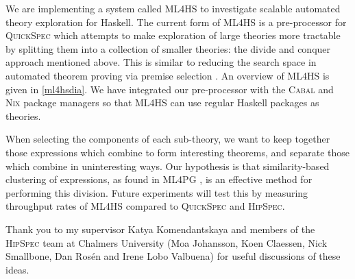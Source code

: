 \documentclass{eceasst}
\begin{document}
We are implementing a system called \textsc{ML4HS} to investigate scalable
automated theory exploration for Haskell. The current form of \textsc{ML4HS} is
a pre-processor for \textsc{QuickSpec} which attempts to make exploration of
large theories more tractable by splitting them into a collection of smaller
theories: the divide and conquer approach mentioned above. This is
similar to reducing the search space in automated theorem proving via premise
selection \cite{kuhlwein2012overview}. An overview of \textsc{ML4HS} is given in
\autoref{ml4hsdia}. We have integrated our pre-processor with the \textsc{Cabal} and
\textsc{Nix} package managers so that \textsc{ML4HS} can use regular Haskell
packages as theories.

When selecting the components of each sub-theory, we want to keep together those
expressions which combine to form interesting theorems, and separate those which
combine in uninteresting ways. Our hypothesis is that similarity-based
clustering of expressions, as found in \textsc{ML4PG}
\cite{journals/corr/abs-1302-6421}, is an effective method for performing this
division. Future experiments will test this by measuring throughput rates of
\textsc{ML4HS} compared to \textsc{QuickSpec} and \textsc{HipSpec}.

\begin{acknowledge}
Thank you to my supervisor Katya Komendantskaya and members of the
\textsc{HipSpec} team at Chalmers University (Moa Johansson, Koen Claessen, Nick
Smallbone, Dan Ros{\'e}n and Irene Lobo Valbuena) for useful discussions of these
ideas.
\end{acknowledge}



\end{document}
